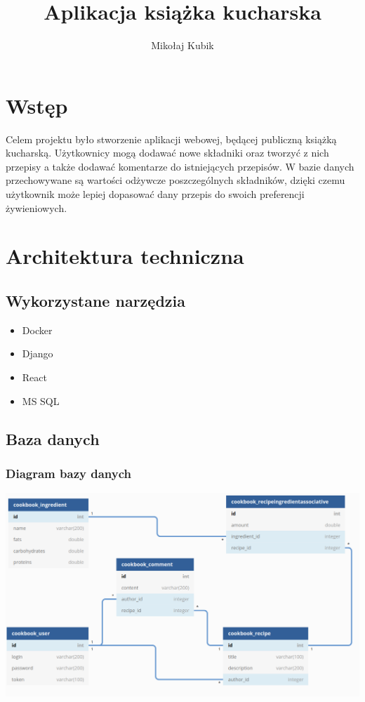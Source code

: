 \documentclass[11pt]{article}
\title{Aplikacja książka kucharska}
\author{Mikołaj Kubik}
\begin{document}
\maketitle
\section{Wstęp}
Celem projektu było stworzenie aplikacji webowej, będącej publiczną książką kucharską. Użytkownicy mogą dodawać nowe składniki
oraz tworzyć z nich przepisy a także dodawać komentarze do istniejących przepisów. W bazie danych przechowywane są wartości 
odżywcze poszczególnych składników, dzięki czemu użytkownik może lepiej dopasować dany przepis do swoich preferencji żywieniowych.

\section{Architektura techniczna}
\subsection{Wykorzystane narzędzia}
\begin{itemize}
    \item Docker
    \item Django
    \item React
    \item MS SQL
\end{itemize}
\subsection{Baza danych}
\subsubsection{Diagram bazy danych}
\includegraphics[width=15.5cm]{db_diagram.png}
\end{document}
